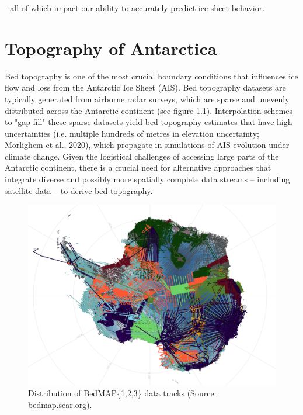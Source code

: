 
 - all of which impact our ability to accurately predict ice sheet behavior\cite{Ockenden_2022}.

\chapter{Topography of Antarctica}\label{review}

Bed topography is one of the most crucial boundary conditions that influences ice flow and loss from the Antarctic Ice Sheet (AIS)\cite{Morlighem_2020}. Bed topography datasets are typically generated from airborne radar surveys, which are sparse and unevenly distributed across the Antarctic continent (see figure \ref{fig:BedMAP}). Interpolation schemes to "gap fill" these sparse datasets yield bed topography estimates that have high uncertainties (i.e. multiple hundreds of metres in elevation uncertainty; Morlighem et al., 2020), which propagate in simulations of AIS evolution under climate change\cite{Castleman_2022}. Given the logistical challenges of accessing large parts of the Antarctic continent, there is a crucial need for alternative approaches that integrate diverse and possibly more spatially complete data streams – including satellite data – to derive bed topography.
\begin{figure}[H]    %
    \includegraphics[scale=0.4]{bedmap.png}
    \caption{Distribution of BedMAP\{1,2,3\} data tracks (Source: bedmap.scar.org).}
    \label{fig:BedMAP}
\end{figure}

